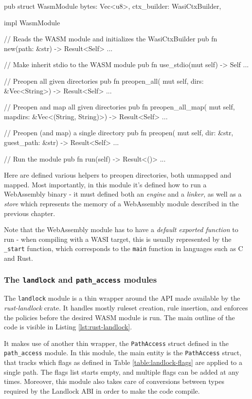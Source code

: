 \begin{code}[language=Rust, caption=The outline of the \texttt{wasm} module]
pub struct WasmModule {
  bytes: Vec<u8>, ctx_builder: WasiCtxBuilder,
}

impl WasmModule {
  // Reads the WASM module and initializes the WasiCtxBuilder
  pub fn new(path: &str) -> Result<Self> { ... }

  // Make inherit stdio to the WASM module
  pub fn use_stdio(mut self) -> Self { ... }

  // Preopen all given directories
  pub fn preopen_all(
    mut self,
    dirs: &Vec<String>) -> Result<Self> {...}

  // Preopen and map all given directories
  pub fn preopen_all_map(
    mut self,
    mapdirs: &Vec<(String, String)>) -> Result<Self> {...}

  // Preopen (and map) a single directory
  pub fn preopen(
    mut self,
    dir: &str, guest_path: &str) -> Result<Self> {...}

  // Run the module
  pub fn run(self) -> Result<()> {...}
}  
\end{code}

Here are defined various helpers to preopen directories, both unmapped and mapped.
Most importantly, in this module it's defined how to run a WebAssembly binary - it must defined both an \textit{engine} and a \textit{linker},
as well as a \textit{store} which represents the memory of a WebAssembly module described in the previous chapter.

Note that the WebAssembly module has to have a \textit{default exported function} to run - when compiling with a WASI target,
this is usually represented by the \texttt{\_start} function, which corresponds to the \texttt{main} function in languages
such as C and Rust.

\subsubsection{The \texttt{landlock} and \texttt{path\_access} modules}

The \texttt{landlock} module is a thin wrapper around the API made available by the \textit{rust-landlock} crate.
It handles mostly ruleset creation, rule insertion, and enforces the policies before the desired WASM module is run.
The main outline of the code is visible in Listing \ref{lst:rust-landlock}.

It makes use of another thin wrapper, the \texttt{PathAccess} struct defined in the \texttt{path\_access} module.
In this module, the main entity is the \texttt{PathAccess} struct, that tracks which flags as defined in Table \ref{table:landlock-flags}
are applied to a single path. The flags list starts empty, and multiple flags can be added at any times.
Moreover, this module also takes care of conversions between types required by the Landlock ABI in order
to make the code compile.

